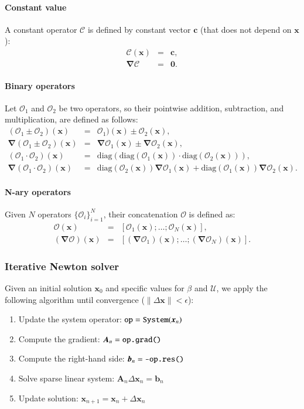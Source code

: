 \documentclass[final]{elsarticle}
\newcommand{\diag}{\ensuremath{\mathrm{diag}}}
\newcommand\eps \epsilon
\newcommand\bnabla{\boldsymbol{\nabla}}
\newcommand\bx{\boldsymbol{x}}
\newcommand\bc{\boldsymbol{c}}
\newcommand\bzero{\boldsymbol{0}}
\newcommand\cO{\mathcal{O}}
\newcommand\cU{\mathscr{U}}
\begin{document}
\paragraph{Constant value}
A constant operator $\mathcal{C}$ is defined by constant vector $\bc$ 
(that does not depend on $\bx$):
\begin{eqnarray*}
\mathcal{C}(\bx) &=& \bc, \\
\bnabla\mathcal{C} &=& \bzero.
\end{eqnarray*}

\paragraph{Binary operators}
Let $\cO_1$ and $\cO_2$ be two operators, so their pointwise addition, subtraction,
and multiplication, are defined as follows:
\begin{eqnarray*}
(\cO_1 \pm \cO_2)(\bx) &=& \cO_1)(\bx) \pm \cO_2(\bx), \\
\bnabla (\cO_1 \pm \cO_2)(\bx)   &=& \bnabla\cO_1(\bx) \pm \bnabla\cO_2(\bx), \\
(\cO_1 \cdot \cO_2)(\bx) &=& \diag(\diag(\cO_1(\bx)) \cdot \diag(\cO_2(\bx))), \\
\bnabla (\cO_1 \cdot \cO_2)(\bx) &=& \diag(\cO_2(\bx)) \bnabla\cO_1(\bx) 
                                  + \diag(\cO_1(\bx)) \bnabla\cO_2(\bx).
\end{eqnarray*}

\paragraph{N-ary operators}
Given $N$ operators $\{\cO_i\}_{i=1}^N$, their concatenation $\cO$ is defined as:
\begin{eqnarray*}
\cO(\bx) &=& [\cO_1(\bx); \ldots; \cO_N(\bx)], \\
(\bnabla\cO)(\bx) &=& [(\bnabla\cO_1)(\bx); \ldots; (\bnabla\cO_N)(\bx)].
\end{eqnarray*}

\subsubsection{Iterative Newton solver}
Given an initial solution $\bx_0$ and specific values for $\beta$ and $\cU$, 
we apply the following algorithm 
until convergence ($\|\Delta \bx\| < \eps$):
\begin{enumerate}
\item Update the system operator: $\verb|op| = \verb|System|(\bx_{n})$
\item Compute the gradient: $\boldsymbol{A}_n = \verb|op.grad()|$
\item Compute the right-hand side: $\boldsymbol{b}_n = \verb|-op.res()|$
\item Solve sparse linear system: $\boldsymbol{A}_n \Delta \bx_n = \boldsymbol{b}_n$
\item Update solution: $\bx_{n+1} = \bx_{n} + \Delta \bx_{n}$
\end{enumerate}
\end{document}
